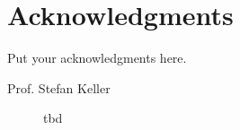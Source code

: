 
\chapter*{Acknowledgments}
Put your acknowledgments here.

\begin{description}
    \item[Prof. Stefan Keller] tbd
\end{description}